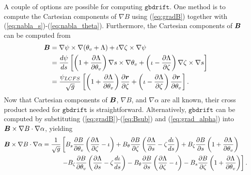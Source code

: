 \documentclass[11pt,letter]{article}
\newcommand{\vect}[1]{\mbox{\boldmath $#1$}}
\newcommand{\gbdrift}{\mathtt{gbdrift}}
\begin{document}
A couple of options are possible for computing $\gbdrift$. One method is to compute the Cartesian components of $\nabla B$ using
(\ref{eq:gradB})
together with (\ref{eq:nabla_s})-(\ref{eq:nabla_theta}). Furthermore, the Cartesian components of $\vect{B}$ can be computed from
\begin{align}
\vect{B} &= \nabla\psi \times \nabla (\theta_v + \Lambda) + \iota \nabla\zeta\times\nabla\psi \nonumber \\
&= \frac{d\psi}{ds} \left[ \left( 1 + \frac{\partial\Lambda}{\partial\theta_v}\right) \nabla s \times\nabla\theta_v 
+ \left(\iota - \frac{\partial\Lambda}{\partial\zeta}\right) \nabla\zeta\times\nabla s \right] \nonumber \\
&= \frac{\psi_{LCFS}}{\sqrt{g}} \left[ \left(1 + \frac{\partial\Lambda}{\partial\theta_v}\right) \frac{\partial\vect{r}}{\partial\zeta}
+ \left( \iota - \frac{\partial\Lambda}{\partial\zeta}\right) \frac{\partial\vect{r}}{\partial\theta_v}\right].
\end{align}
Now that Cartesian components of $\vect{B}$, $\nabla B$, and $\nabla \alpha$ are all known, their cross product
needed for $\gbdrift$ is straightforward. Alternatively, $\gbdrift$ can be computed by substituting (\ref{eq:gradB})-(\ref{eq:Bsub}) and (\ref{eq:grad_alpha}) into $\vect{B}\times\nabla B \cdot\nabla\alpha$, yielding
\begin{align}
\vect{B}\times\nabla B \cdot\nabla\alpha
=
\frac{1}{\sqrt{g}} &\left[
B_s \frac{\partial B}{\partial \theta_v} \left(\frac{\partial \Lambda}{\partial\zeta} - \iota \right)
+ B_\theta \frac{\partial B}{\partial\zeta} \left( \frac{\partial\Lambda}{\partial s} - \zeta \frac{d\iota}{ds}\right)
+ B_\zeta \frac{\partial B}{\partial s} \left( 1 + \frac{\partial \Lambda}{\partial \theta_v}\right) \right. \nonumber \\
&\left.-B_\zeta \frac{\partial B}{\partial\theta_v} \left( \frac{\partial\Lambda}{\partial s} - \zeta \frac{d\iota}{ds}\right)
-B_\theta \frac{\partial B}{\partial s} \left( \frac{\partial \Lambda}{\partial\zeta}-\iota\right)
-B_s \frac{\partial B}{\partial\zeta} \left( 1 + \frac{\partial\Lambda}{\partial\theta_v}\right)
\right].
\end{align}
\end{document}
